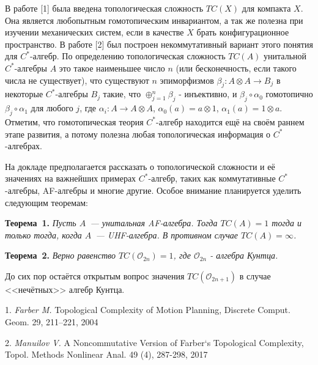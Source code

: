 


\vzmscaption


В работе [1] была введена топологическая сложность $TC(X)$ для компакта $X$. Она является любопытным гомотопическим инвариантом, а так же полезна при изучении механических систем, если в качестве $X$ брать конфигурационное пространство. В работе [2] был построен некоммутативный вариант этого понятия для $C^*$-алгебр. По определению топологическая сложность $TC(A)$ унитальной $C^*$-алгебры $A$ это такое наименьшее число $n$ (или бесконечность, если такого числа не существует), что существуют $n$ эпиморфизмов $\beta_j:A\otimes A\to B_j$ в некоторые $C^*$-алгебры $B_j$ такие, что $\oplus_{j=1}^n\beta_j$ - инъективно, и $\beta_j\circ\alpha_0$ гомотопично $\beta_j\circ\alpha_1$ для любого $j$, где $\alpha_i:A\to A\otimes A$, $\alpha_0(a)=a\otimes1$, $\alpha_1(a)=1\otimes a$. Отметим, что гомотопическая теория $C^*$-алгебр находится ещё на своём раннем этапе развития, а потому полезна любая топологическая информация о $C^*$-алгебрах.

На докладе предполагается рассказать о топологической сло\-жности и её значениях на важнейших примерах $C^*$-алгебр, таких как коммутативные $C^*$-алгебры, AF-алгебры и многие другие. Особое внимание планируется уделить следующим теоремам:

\textbf{Теорема~1.} {\it Пусть $A$~--- унитальная AF-алгебра.
Тогда
\linebreak
${TC(A)=1}$ тогда и только тогда, когда $A$~--- UHF-алгебра. В противном случае $TC(A)=\infty$.}

\textbf{Теорема~2.} {\it Верно равенство $TC(\mathcal{O}_{2n})=1$, где $\mathcal{O}_{2n}$ - алгебра Кунтца.}

До сих пор остаётся открытым вопрос значения $TC(\mathcal{O}_{2n+1})$ в случае <<нечётных>> алгебр Кунтца.

\litlist

1. {\it Farber M.} Topological Complexity of Motion Planning, Dis\-c\-re\-te Comput. Geom. 29, 211–221, 2004

2. {\it Manuilov V.} A Noncommutative Version of Farber`s Topo\-lo\-gi\-cal Complexity, Topol. Methods Nonlinear
Anal. 49 (4), 287-298, 2017
